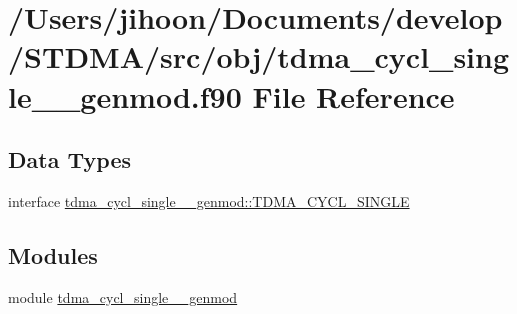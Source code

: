 \hypertarget{tdma__cycl__single____genmod_8f90}{}\section{/\+Users/jihoon/\+Documents/develop/\+S\+T\+D\+M\+A/src/obj/tdma\+\_\+cycl\+\_\+single\+\_\+\+\_\+genmod.f90 File Reference}
\label{tdma__cycl__single____genmod_8f90}
\subsection*{Data Types}
\begin{DoxyCompactItemize}
\item 
interface \mbox{\hyperlink{interfacetdma__cycl__single____genmod_1_1_t_d_m_a___c_y_c_l___s_i_n_g_l_e}{tdma\+\_\+cycl\+\_\+single\+\_\+\+\_\+genmod\+::\+T\+D\+M\+A\+\_\+\+C\+Y\+C\+L\+\_\+\+S\+I\+N\+G\+LE}}
\end{DoxyCompactItemize}
\subsection*{Modules}
\begin{DoxyCompactItemize}
\item 
module \mbox{\hyperlink{namespacetdma__cycl__single____genmod}{tdma\+\_\+cycl\+\_\+single\+\_\+\+\_\+genmod}}
\end{DoxyCompactItemize}
